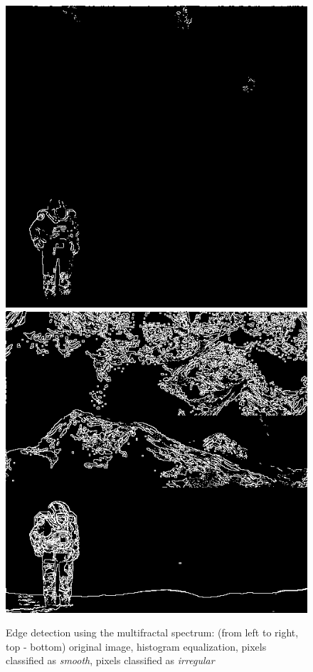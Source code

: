 \documentclass[oneside,a4paper,english,links,12pt]{article}
\begin{document}
\begin{figure}[htb]
\includegraphics[scale=0.25]{imagenes/edgemaxsmooth}
\includegraphics[scale=0.25]{imagenes/edgemaxirreg}
\caption{Edge detection using the multifractal spectrum: (from left to right, top - bottom) original image, histogram equalization, pixels classified as {\em smooth}, pixels classified as {\em irregular}}
\label{fig:camera}
\end{figure}
\end{document}
